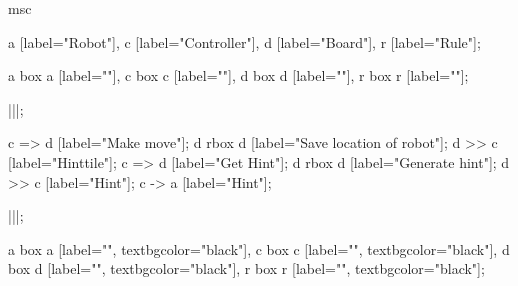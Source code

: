 \begin{msc}
msc
{

a [label="Robot"],
c [label="Controller"],
d [label="Board"],
r [label="Rule"];

a box a [label=""],
c box c [label=""],
d box d [label=""],
r box r [label=""];

|||;

c => d [label="Make move"];
d rbox d [label="Save location of robot"];
d >> c [label="Hinttile"];
c => d [label="Get Hint"];
d rbox d [label="Generate hint"];
d >> c [label="Hint"];
c -> a [label="Hint"];

|||;

a box a [label="", textbgcolor="black"],
c box c [label="", textbgcolor="black"],
d box d [label="", textbgcolor="black"],
r box r [label="", textbgcolor="black"];

}
\end{msc}
